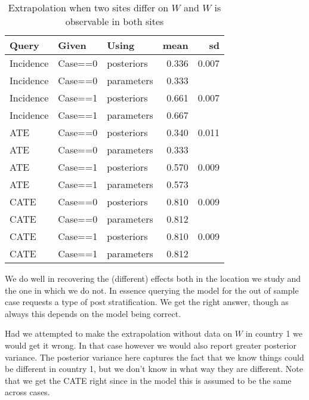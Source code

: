 \documentclass[
  12pt,
]{book}
\begin{document}
\begin{table}

\caption{\label{tab:unnamed-chunk-110}Extrapolation when two sites differ on $W$ and $W$ is observable in both sites}
\centering
\begin{tabular}[t]{l|l|l|r|r}
\hline
Query & Given & Using & mean & sd\\
\hline
Incidence & Case==0 & posteriors & 0.336 & 0.007\\
\hline
Incidence & Case==0 & parameters & 0.333 & \\
\hline
Incidence & Case==1 & posteriors & 0.661 & 0.007\\
\hline
Incidence & Case==1 & parameters & 0.667 & \\
\hline
ATE & Case==0 & posteriors & 0.340 & 0.011\\
\hline
ATE & Case==0 & parameters & 0.333 & \\
\hline
ATE & Case==1 & posteriors & 0.570 & 0.009\\
\hline
ATE & Case==1 & parameters & 0.573 & \\
\hline
CATE & Case==0 & posteriors & 0.810 & 0.009\\
\hline
CATE & Case==0 & parameters & 0.812 & \\
\hline
CATE & Case==1 & posteriors & 0.810 & 0.009\\
\hline
CATE & Case==1 & parameters & 0.812 & \\
\hline
\end{tabular}
\end{table}

We do well in recovering the (different) effects both in the location we study and the one in which we do not. In essence querying the model for the out of sample case requests a type of post stratification. We get the right answer, though as always this depends on the model being correct.

Had we attempted to make the extrapolation without data on \(W\) in country 1 we would get it wrong. In that case however we would also report greater posterior variance. The posterior variance here captures the fact that we know things could be different in country 1, but we don't know in what way they are different. Note that we get the CATE right since in the model this is assumed to be the same across cases.
\end{document}
